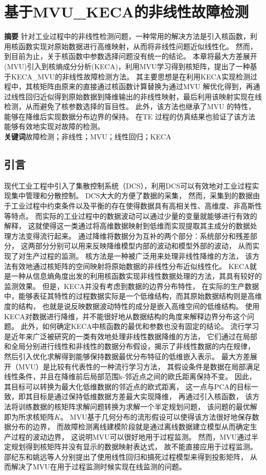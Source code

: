 \chapter{基于MVU\_KECA的非线性故障检测}
\noindent \textbf{摘要}
\quad 针对工业过程中的非线性检测问题，一种常用的解决方法是引入核函数，利用核函数实现对原始数据进行高维映射，从而将非线性问题近似线性化。
然而，到目前为止，关于核函数中参数选择问题没有统一的结论。
本章将最大方差展开(MVU)引入到核熵成分分析(KECA)，利用MVU学习得到核矩阵，提出了一种基于KECA\_MVU的非线性故障检测方法。
其主要思想是在利用KECA实现检测过程中，其核矩阵由原来的直接通过核函数计算替换为通过MVU 解优化得到，再通过线性回归近似得到原始数据到降维输出的非线性映射，最后利用该映射实现在线检测，从而避免了核参数选择的盲目性。
此外，该方法也继承了MVU 的特性，能够在降维后实现数据分布边界的保持。
在TE 过程的仿真结果也验证了该方法能够有效地实现对故障的检测。\\
\textbf{关键词}\quad 故障检测；非线性；MVU；线性回归；KECA

\section{引言}
现代工业工程中引入了集散控制系统（DCS），利用DCS可以有效地对工业过程实现集中管理和分散控制。
DCS大大的方便了数据的采集，
然而，采集到的数据由于工业过程中约束条件以及平衡的存在使得数据具有高相关性、高维度、非高斯性等特点。
而实际的工业过程中的数据波动可以通过少量的变量就能够进行有效的解释，
这就使得这一类通过将高维数据映射到低维而实现提取其主成分的数据处理方法变得流行起来。
通过降维将数据分为互补的两个部分：系统部分和残差部分，
这两部分分别可以用来反映降维模型内部的波动和模型外部的波动，
从而实现了对生产过程的监测。
核方法是一种被广泛用来处理非线性降维的方法，
该方法有效地通过核矩阵的空间映射将原始数据的非线性分布近似线性化。
KECA就是一种从信息熵角度出发的利用核函数实现非线性数据处理的方法，其具有较好的监测效果。
但是，KECA并没有考虑到数据的边界分布特性，
在实际的生产数据中，能够表征其特性的过程数据实际是一个低维结构，而其原始数据结构则是高维度的结构，
也就是说反映数据波动特性的成分是嵌入高维空间的低维结构。
使用KECA对数据进行降维，并不能很好地从数据结构的角度来解释边界分布这个问题。
此外，如何确定KECA中核函数的最优和参数也没有固定的结论。
流行学习是近年来广泛被研究的一类有效地处理非线性数据降维的方法，
它们通过在局部和全局分别进行线性和非线性的数据分布假设，揭示了非线性数据的内在规律，
然后引入优化求解得到能够保持数据最优分布特征的低维嵌入表示。
最大方差展开（MVU）是比较有代表性的一种流行学习方法，
其假设条件是数据在局部满足线性条件，并且在降维前后局部范围k-邻近点之间的欧氏距离保持不变。
因此，其目标可以转换为最大化低维数据的邻近点的欧式距离，
这一点与PCA的目标一致，即其目标是通过保持低维数据方差最大实现降维，
再通过引入核函数，
该方法将训练数据的核矩阵求解问题转换为求解一个半定规划问题，
该问题的最优解即为所求核矩阵$K$。
MVU基于几何分布的流形假设可以使得该方法很好地保存数据分布的边界，
而故障检测离线建模阶段就是通过离线数据建立模型从而确定生产过程的波动边界，
这说明MVU可以很好地用于过程监测。
然而，MVU通过半定规划得到核矩阵并没有显示的数据映射表达式，
故不能直接应用于过程监测。
邵纪东和姚远等人分别提出了使用线性回归和搞死过程模型来得到投影矩阵，
从而解决了MVU在用于过程监测时候实现在线监测的问题。

